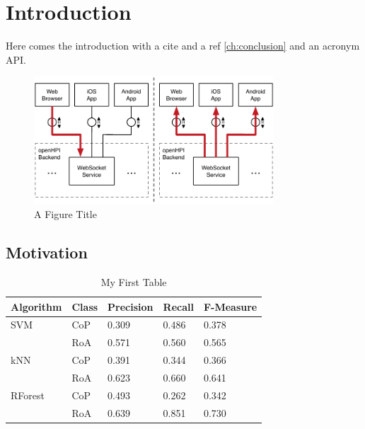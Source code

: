 \chapter{Introduction}\label{ch:introduction}

Here comes the introduction with a cite \cite{renz2016lak} and a ref \autoref{ch:conclusion} and an acronym \ac{API}.

\begin{figure}[!h]
	\centering
	\includegraphics[width=0.8\textwidth]{figures/websocket}
	\caption[A Figure Short-Title]{A Figure Title}
	\label{fig:websocket}
\end{figure}

\section{Motivation}

\begin{table}[!h]
\centering
\begin{tabular}{@{}lllll@{}}
\toprule
Algorithm & Class & Precision & Recall & F-Measure \\ \midrule
SVM       & CoP   & 0.309     & 0.486  & 0.378     \\ \cmidrule(l){2-5} 
          & RoA   & 0.571     & 0.560  & 0.565     \\ \midrule
kNN       & CoP   & 0.391     & 0.344  & 0.366     \\ \cmidrule(l){2-5} 
          & RoA   & 0.623     & 0.660  & 0.641     \\ \midrule
RForest   & CoP   & 0.493     & 0.262  & 0.342     \\ \cmidrule(l){2-5} 
          & RoA   & 0.639     & 0.851  & 0.730     \\ \bottomrule
\end{tabular}
\caption{My First Table}
\label{tab:first-table}
\end{table}

